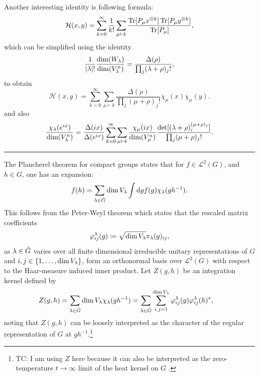 \documentclass[notitlepage, 10pt]{article}
\begin{document}
    Another interesting identity is following formula:
    \begin{equation}
        \mathcal H(x,y) = \sum_{k=0}^{\infty} \frac{1}{k!} \sum_{\mu\vdash k} \frac{\operatorname{Tr}[P_{\mu}x^{\otimes k}]\operatorname{Tr}[P_{\mu}y^{\otimes k}]}{\operatorname{Tr}[P_{\mu}]},
    \end{equation}
    which can be simplified using the identity
    \begin{equation}
        \frac{1}{{|\lambda|}!}\frac{\dim(W_{\lambda})}{\dim(V_{\lambda}^{n})} = \frac{\Delta(\rho)}{\prod_j(\lambda+\rho)_j!},
    \end{equation}
    to obtain
    \begin{equation}
        \mathcal H(x,y) = \sum_{k=0}^{\infty}\sum_{\mu\vdash k} \frac{\Delta(\rho)}{\prod_j(\mu+\rho)_j!} \chi_{\mu}(x)\chi_{\mu}(y).
    \end{equation}
    and also
    \begin{equation}
        \frac{\chi_{\lambda}(e^{ix})}{\dim(V_{\lambda}^{n})} = \frac{\Delta(ix)}{\Delta(e^{ix})} \sum_{k=0}^{\infty}\sum_{\mu\vdash k} \frac{\chi_{\mu}(ix)}{\dim(V_{\mu}^{n})} \frac{\det[(\lambda+\rho)_i^{(\mu+\rho)_j}]}{\prod_j(\mu+\rho)_j!}.
    \end{equation}
\hrule
    The Plancherel theorem for compact groups states that for $f \in \mathcal L^{2}(G)$, and $h \in G$, one has an expansion:
    \begin{equation}
        f(h) = \sum_{\lambda \in \hat G} \dim V_{\lambda} \int \mathrm{d} g f(g) \chi_{\lambda}(gh^{-1}).
    \end{equation}
    This follows from the Peter-Weyl theorem which states that the rescaled matrix coefficients
    \begin{equation}
       \varphi^{\lambda}_{ij}(g) \coloneqq \sqrt{\dim V_{\lambda}} \pi_{\lambda}(g)_{ij},
    \end{equation}
    as $\lambda \in \hat G$ varies over all finite dimensional irreducible unitary representations of $G$ and $i,j \in \{1, \ldots, \dim V_{\lambda}\}$,
    form an orthonormal basis over $\mathcal L^{2}(G)$ with respect to the Haar-measure induced inner product.
    Let $Z(g,h)$ be an integration kernel defined by
    \begin{align}
        Z(g,h) 
        &= \sum_{\lambda \in \hat G} \dim V_{\lambda} \chi_{\lambda}(gh^{-1})
        = \sum_{\lambda \in \hat G} \sum_{i,j=1}^{\dim V_{\lambda}} \varphi_{ij}^{\lambda}(g) \varphi_{ij}^{\lambda}(h)^{*},
    \end{align}
    noting that $Z(g,h)$ can be loosely interpreted as the character of the regular representation of $G$ at $gh^{-1}$.\footnote{TC: I am using $Z$ here because it can also be interpreted as the zero-temperature $t \to \infty$ limit of the heat kernel on $G$ \cite{mcswiggen2021harish,fegan1978heat}.}
\end{document}
